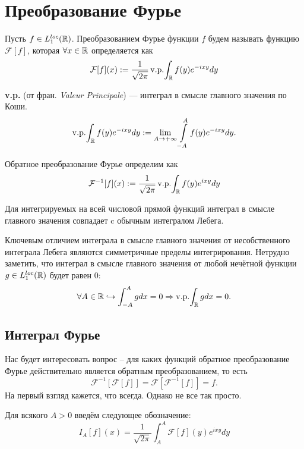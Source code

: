 \section{Преобразование Фурье}
\begin{definition}
Пусть $f \in L_1^{loc}(\mathbb{R})$.
Преобразованием Фурье функции $f$ будем называть функцию $\mathcal{F}[f]$, которая $\forall x \in \mathbb{R}$ определяется как
\[
    \mathcal{F}[f](x) := \dfrac{1}{\sqrt {2\pi}}\mathop{\mathrm{v.p.}}\!\int_{\mathbb{R}} f(y)e^{-ixy}dy
\]
\end{definition}

\begin{note}
\textbf{v.p.} (от фран. \textit{Valeur Principale}) — интеграл в смысле главного значения по Коши.
\[
\mathop{\mathrm{v.p.}}\!\int_{\mathbb{R}} f(y) e^{-ixy}dy := \lim_{A \to +\infty} \int\limits_{-A}^{A} f(y)e^{-ixy}dy.
\]
\end{note}

\begin{definition}
    Обратное преобразование Фурье определим как
    \[
        \mathcal{F}^{-1}[f](x) := \dfrac{1}{\sqrt {2\pi}}\mathop{\mathrm{v.p.}}\!\int_{\mathbb{R}} f(y)e^{ixy}dy
    \]
\end{definition}

\begin{note}
    Для интегрируемых на всей числовой прямой функций интеграл в смысле главного значения совпадает c обычным интегралом Лебега.
\end{note}

\begin{note}
    Ключевым отличием интеграла в смысле главного значения от несобственного интеграла Лебега являются симметричные пределы интегрирования.
    Нетрудно заметить, что интеграл в смысле главного значения от любой нечётной функции $g \in L_1^{loc}(\mathbb{R})$ будет равен 0:
    \[
        \forall A \in \mathbb{R} \hookrightarrow \int_{-A}^{A} g dx = 0 \Rightarrow \mathop{\mathrm{v.p.}}\!\int_{\mathbb{R}} gdx = 0.
    \]
\end{note}
\subsection{Интеграл Фурье}
\begin{question}
Нас будет интересовать вопрос -- для каких функций обратное преобразование Фурье действительно является обратным преобразованием, то есть
\[
    \mathcal{F}^{-1}[\mathcal{F}[f]] = \mathcal{F}[\mathcal{F}^{-1}[f]] = f.
\]
На первый взгляд кажется, что всегда.
Однако не все так просто.
\end{question}
\begin{definition}
    Для всякого $A > 0$ введём следующее обозначение:
    \[
        I_A[f](x) = \dfrac{1}{\sqrt {2\pi}} \int_{A}^{A} \mathcal{F}[f](y)e^{ixy}dy
    \]
\end{definition}

